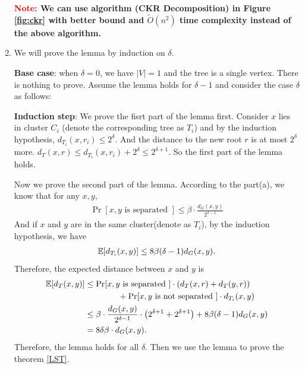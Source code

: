 \begin{answer}
\begin{enumerate}[label=\alph*).]
        \textbf{\textcolor{red}{Note:} We can use algorithm (CKR Decomposition) in Figure \ref{fig:ckr} with better bound and $\tilde{O}(n^2)$ time complexity instead of the above algorithm.}
        \item We will prove the lemma by induction on $\delta$. 
        
        \textbf{Base case}: when $\delta = 0$, we have $|V| = 1$ and the tree is a single vertex. There is nothing to prove.
        Assume the lemma holds for $\delta - 1$ and consider the case $\delta$ as follows:
        
        \textbf{Induction step}: We prove the fisrt part of the lemma first.
            Consider $x$ lies in cluster $C_i$ (denote the corresponding tree as $T_i$) and by the induction hypothesis, $d_{T_i}(x, r_i) \le 2^{\delta}$. 
            And the distance to the new root $r$ is at most $2^{\delta}$ more. $d_{T}(x, r) \le d_{T_i}(x, r_i) + 2^{\delta} \le 2^{\delta + 1}$.
            So the first part of the lemma holds.

            Now we prove the second part of the lemma. According to the part(a), we know that for any $x, y$, 
            \begin{align*}
                \Pr[x, y \text{ is separated }] \le \beta\cdot \frac{d_{G}(x,y)}{2^{\delta-1}}
            \end{align*}
            And if $x$ and $y$ are in the same cluster(denote as $T_i$), by the induction hypothesis, we have
            \begin{align*}
                \operatorname*{\mathbb{E}}[d_{T_i}(x,y)] \le 8\beta(\delta - 1) d_{G}(x,y).
            \end{align*}
            Therefore, the expected distance between $x$ and $y$ is
            \begin{align*}
                \operatorname*{\mathbb{E}}[d_T(x,y)] &\le \Pr[x, y \text{ is separated }] \cdot (d_T(x, r) + d_T(y, r)) \\
                & \quad \quad \quad \quad + \Pr[x, y \text{ is not separated }] \cdot d_{T_i}(x,y) \\
                &\le \beta\cdot \frac{d_{G}(x,y)}{2^{\delta-1}} \cdot \left(2^{\delta + 1} + 2^{\delta + 1}\right) + 8\beta(\delta - 1) d_G(x,y) \\
                &= 8\delta\beta\cdot d_G(x,y).
            \end{align*}
            Therefore, the lemma holds for all $\delta$. Then we use the lemma to prove the theorem \ref{LST}. 
            

\end{enumerate}
\end{answer}
